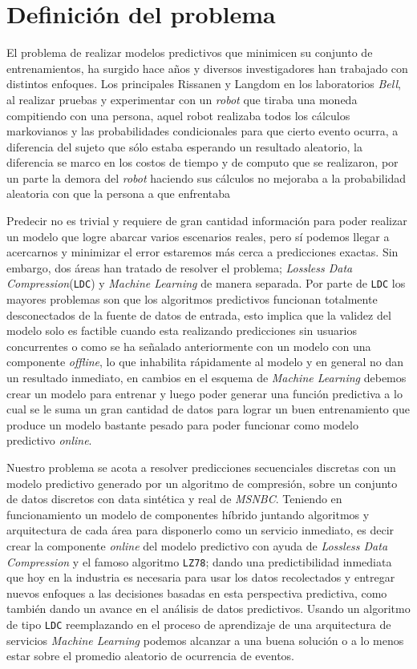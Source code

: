 

\section{Definición del problema}


El problema de realizar modelos predictivos que minimicen su conjunto de entrenamientos, ha surgido hace años y diversos investigadores han trabajado con distintos enfoques. Los principales Rissanen\cite{Rissanen1983} y Langdom\cite{Langdon1983} en los laboratorios \emph{Bell}, al realizar pruebas y experimentar con un \emph{robot} que tiraba una moneda compitiendo con una persona, aquel robot realizaba todos los cálculos {markovianos} y las probabilidades condicionales para que cierto evento ocurra, a diferencia del sujeto que sólo estaba esperando un resultado aleatorio, la diferencia se marco en los costos de tiempo y de computo que se realizaron, por un parte la demora del \emph{robot} haciendo sus cálculos no mejoraba a la probabilidad aleatoria con que la persona a que enfrentaba 

Predecir no es trivial y requiere de gran cantidad información para poder realizar un modelo que logre abarcar varios escenarios reales, pero sí podemos llegar a acercarnos y minimizar el error  estaremos más cerca a predicciones exactas. Sin embargo, dos áreas han tratado de resolver el problema;  \emph{Lossless Data Compression}(\texttt{LDC}) y \emph{Machine Learning} de manera separada. Por parte de \texttt{LDC} los mayores problemas son que los algoritmos predictivos  funcionan totalmente desconectados de la fuente de datos de entrada, esto implica que la validez del modelo solo es factible cuando esta realizando predicciones sin usuarios concurrentes o como se ha señalado anteriormente con un modelo con una componente \emph{offline}, lo que inhabilita rápidamente al modelo y en general no dan un resultado inmediato, en cambios en el esquema de \emph{Machine Learning} debemos crear un modelo para entrenar y luego poder generar una función predictiva a lo cual se le suma un gran cantidad de datos para lograr un buen entrenamiento que produce un modelo bastante pesado para poder funcionar como modelo predictivo \emph{online}. 

Nuestro problema se acota a resolver predicciones secuenciales discretas con un modelo predictivo generado por un algoritmo de compresión, sobre un conjunto de datos discretos con data sintética y real de \emph{MSNBC}\cite{Claude2014}. Teniendo en funcionamiento un modelo de componentes híbrido juntando algoritmos y arquitectura de cada área para disponerlo como un servicio inmediato, es decir crear la componente \emph{online} del modelo predictivo con ayuda de \emph{Lossless Data Compression} y el famoso algoritmo \texttt{LZ78}; dando una predictibilidad inmediata que hoy en la industria es necesaria para usar los datos recolectados y entregar nuevos enfoques a las decisiones basadas en esta perspectiva predictiva, como también dando un avance en el análisis de datos predictivos. Usando un algoritmo de tipo \texttt{LDC} reemplazando en el proceso de aprendizaje de una arquitectura de  servicios  \emph{Machine Learning} podemos alcanzar a una buena solución o a lo menos estar sobre el promedio aleatorio de ocurrencia de eventos.

